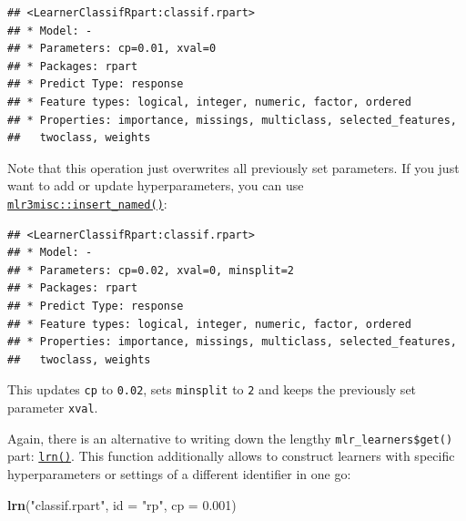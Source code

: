 \documentclass[]{scrbook}
\newenvironment{Shaded}{\begin{snugshade}}{\end{snugshade}}
\newcommand{\DataTypeTok}[1]{\textcolor[rgb]{0.13,0.29,0.53}{#1}}
\newcommand{\DecValTok}[1]{\textcolor[rgb]{0.00,0.00,0.81}{#1}}
\newcommand{\FloatTok}[1]{\textcolor[rgb]{0.00,0.00,0.81}{#1}}
\newcommand{\KeywordTok}[1]{\textcolor[rgb]{0.13,0.29,0.53}{\textbf{#1}}}
\newcommand{\NormalTok}[1]{#1}
\newcommand{\OperatorTok}[1]{\textcolor[rgb]{0.81,0.36,0.00}{\textbf{#1}}}
\newcommand{\StringTok}[1]{\textcolor[rgb]{0.31,0.60,0.02}{#1}}
\renewenvironment{Shaded} {\begin{snugshade}\small} {\end{snugshade}}
\begin{document}
\begin{verbatim}
## <LearnerClassifRpart:classif.rpart>
## * Model: -
## * Parameters: cp=0.01, xval=0
## * Packages: rpart
## * Predict Type: response
## * Feature types: logical, integer, numeric, factor, ordered
## * Properties: importance, missings, multiclass, selected_features,
##   twoclass, weights
\end{verbatim}

Note that this operation just overwrites all previously set parameters.
If you just want to add or update hyperparameters, you can use \href{https://mlr3misc.mlr-org.com/reference/insert_named.html}{\texttt{mlr3misc::insert\_named()}}:

\begin{Shaded}
\end{Shaded}

\begin{verbatim}
## <LearnerClassifRpart:classif.rpart>
## * Model: -
## * Parameters: cp=0.02, xval=0, minsplit=2
## * Packages: rpart
## * Predict Type: response
## * Feature types: logical, integer, numeric, factor, ordered
## * Properties: importance, missings, multiclass, selected_features,
##   twoclass, weights
\end{verbatim}

This updates \texttt{cp} to \texttt{0.02}, sets \texttt{minsplit} to \texttt{2} and keeps the previously set parameter \texttt{xval}.

Again, there is an alternative to writing down the lengthy \texttt{mlr\_learners\$get()} part: \href{https://mlr3.mlr-org.com/reference/mlr_sugar.html}{\texttt{lrn()}}.
This function additionally allows to construct learners with specific hyperparameters or settings of a different identifier in one go:

\begin{Shaded}
\begin{Highlighting}[]
\KeywordTok{lrn}\NormalTok{(}\StringTok{"classif.rpart"}\NormalTok{, }\DataTypeTok{id =} \StringTok{"rp"}\NormalTok{, }\DataTypeTok{cp =} \FloatTok{0.001}\NormalTok{)}
\end{Highlighting}
\end{Shaded}
\end{document}
